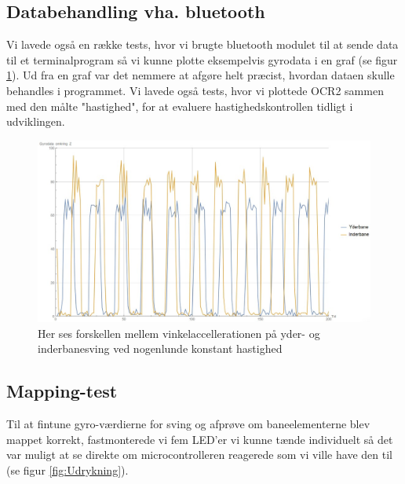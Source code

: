 \pagebreak

\subsection{Databehandling vha. bluetooth}

Vi lavede også en række tests, hvor vi brugte bluetooth modulet til at sende data til et terminalprogram så vi kunne plotte eksempelvis gyrodata i en graf (se figur \ref{fig:Gyro}). Ud fra en graf var det nemmere at afgøre helt præcist, hvordan dataen skulle behandles i programmet. Vi lavede også tests, hvor vi plottede OCR2 sammen med den målte "hastighed", for at evaluere hastighedskontrollen tidligt i udviklingen.

\begin{figure}[h]

	\centering
		\includegraphics[scale=0.4]{Billeder/Gyro.jpg}
	\caption{Her ses forskellen mellem vinkelaccellerationen på yder- og inderbanesving ved nogenlunde konstant hastighed}
	\label{fig:Gyro}
	
\end{figure}

\pagebreak

\subsection{Mapping-test}

Til at fintune gyro-værdierne for sving og afprøve om baneelementerne blev mappet korrekt, fastmonterede vi fem LED'er vi kunne tænde individuelt så det var muligt at se direkte om microcontrolleren reagerede som vi ville have den til (se figur \ref{fig:Udrykning}). 

